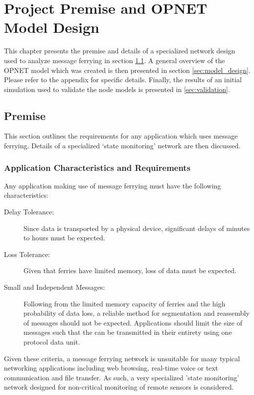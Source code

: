 \chapter{Project Premise and OPNET Model Design} 

This chapter presents the premise and details of a specialized network design used to analyze message ferrying in section \ref{sec:premise}.
A general overview of the OPNET model which was created is then presented in section \ref{sec:model_design}.
Please refer to the appendix for specific details.
Finally, the results of an initial simulation used to validate the node models is presented in \ref{sec:validation}.

\section{Premise}
\label{sec:premise}

This section outlines the requirements for any application which uses message ferrying.
Details of a specialized \lq{}state monitoring\rq{} network are then discussed.

\subsection{Application Characteristics and Requirements}
\label{sec:premise_appchar}

Any application making use of message ferrying must have the following characteristics:

\begin{description}
\item[Delay Tolerance: ]
Since data is transported by a physical device, significant delays of minutes to hours must be expected.
\item[Loss Tolerance: ]
Given that ferries have limited memory, loss of data must be expected.
\item[Small and Independent Messages: ]
Following from the limited memory capacity of ferries and the high probability of data loss, a reliable method for segmentation and reassembly of messages should not be expected. 
Applications should limit the size of messages such that the can be transmitted in their entirety using one protocol data unit.
\end{description}

Given these criteria, a message ferrying network is unsuitable for many typical networking applications including web browsing, real-time voice or text communication and file transfer.
As such, a very specialized 'state monitoring' network designed for non-critical monitoring of remote sensors is considered.

